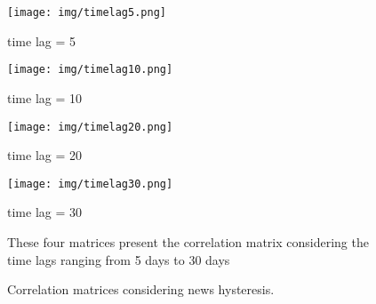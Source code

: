 \begin{figure}
     \centering
     \begin{minipage}[b]{0.2\textwidth}
         \centering
         \texttt{[image: img/timelag5.png]}
         \caption{time lag = 5}
         \label{fig:y equals x}
     \end{minipage}
     \hfill
     \begin{minipage}[b]{0.2\textwidth}
         \centering
         \texttt{[image: img/timelag10.png]}
         \caption{time lag = 10}
         \label{fig:three sin x}
     \end{minipage}
     \hfill
     \begin{minipage}[b]{0.2\textwidth}
         \centering
         \texttt{[image: img/timelag20.png]}
         \caption{time lag = 20}
         
     \end{minipage}
     \hfill
     \begin{minipage}[b]{0.2\textwidth}
         \centering
         \texttt{[image: img/timelag30.png]}
         \caption{time lag = 30}
         \label{fig:five over x}
     \end{minipage}
     \par These four matrices present the correlation matrix considering the time lags ranging from 5 days to 30 days
        \caption{Correlation matrices considering news hysteresis.}
        
        \label{matrice}
\end{figure}



